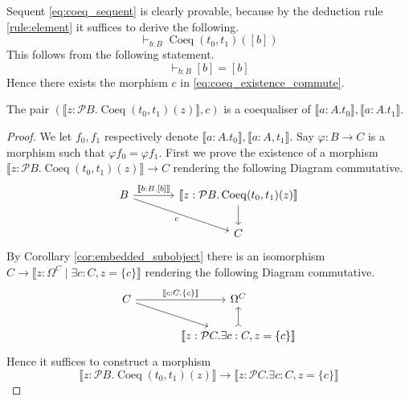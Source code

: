 \documentclass{tac}
\newcommand{\call}[1]{\mathcal{#1}}
\newcommand{\lto}{\longrightarrow}
\begin{document}
	Sequent \eqref{eq:coeq_sequent} is clearly provable, because by the deduction rule \eqref{rule:element} it suffices to derive the following.
	\begin{equation}
		\vdash_{b:B}\operatorname{Coeq}(t_0,t_1)([b])
	\end{equation}
	This follows from the following statement.
	\begin{equation}
		\vdash_{b:B}[b] = [b]
	\end{equation}
	Hence there exists the morphism $c$ in \eqref{eq:coeq_existence_commute}.
	\begin{proposition}
		The pair $(\llbracket z: \call{P}B. \operatorname{Coeq}(t_0,t_1)(z)\rrbracket,c)$ is a coequaliser of $\llbracket a:A. t_0\rrbracket, \llbracket a:A. t_1\rrbracket$.
	\end{proposition}
	\begin{proof}
		We let $f_0,f_1$ respectively denote $\llbracket a:A. t_0\rrbracket, \llbracket a:A, t_1\rrbracket$. Say $\varphi: B \lto C$ is a morphism such that $\varphi f_0 = \varphi f_1$. First we prove the existence of a morphism $\llbracket z: \call{P}B. \operatorname{Coeq}(t_0,t_1)(z)\rrbracket \lto C$ rendering the following Diagram commutative.
		\begin{equation}
			\begin{tikzcd}[column sep = large]
				B\arrow[dr,swap,"c"]\arrow[r,"{\llbracket b:B. [b]\rrbracket}"] & \llbracket z: \call{P}B. \operatorname{Coeq}(t_0,t_1)(z)\rrbracket\arrow[d]\\
				& C
			\end{tikzcd}
		\end{equation}
		By Corollary \ref{cor:embedded_subobject} there is an isomorphism $C \lto \llbracket z: \Omega^C \mid \exists c:C, z = \lbrace c \rbrace \rrbracket$ rendering the following Diagram commutative.
		\begin{equation}
			\begin{tikzcd}[column sep = large]
				C\arrow[r,"{\llbracket c:C. \lbrace c \rbrace \rrbracket}"]\arrow[dr] & \Omega^C\\
				& \llbracket z: \call{P}C . \exists c:C, z = \lbrace c \rbrace \rrbracket\arrow[u,rightarrowtail]
			\end{tikzcd}
		\end{equation}
		Hence it suffices to construct a morphism
		\begin{equation}
			\llbracket z: \call{P}B . \operatorname{Coeq}(t_0,t_1)(z)\rrbracket \lto \llbracket z: \call{P}C. \exists c: C, z = \lbrace c \rbrace \rrbracket

\end{equation}
\end{proof}
\end{document}
